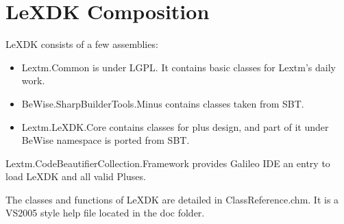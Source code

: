 
\chapter{LeXDK Composition}
\newpage
{}
LeXDK consists of a few assemblies:
\begin{itemize}
\item Lextm.Common is under LGPL. It contains basic classes for Lextm's daily
work.
\item BeWise.SharpBuilderTools.Minus contains classes taken from SBT.
\item Lextm.LeXDK.Core contains classes for plus design, and part of it under
BeWise namespace is ported from SBT.
\end{itemize}

Lextm.CodeBeautifierCollection.Framework provides Galileo IDE an entry to load
LeXDK and all valid Pluses.

The classes and functions of LeXDK are detailed in ClassReference.chm. It is a
VS2005 style help file located in the doc folder.
